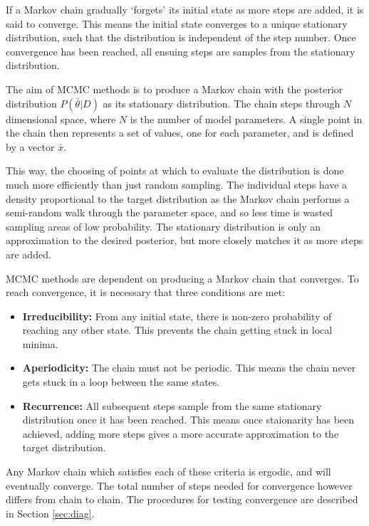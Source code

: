If a Markov chain gradually `forgets' its initial state as more steps are added, it is said to converge. This means the initial state converges to a unique stationary distribution, such that the distribution is independent of the step number. Once convergence has been reached, all ensuing steps are samples from the stationary distribution.

The aim of MCMC methods is to produce a Markov chain with the posterior distribution $P(\bar{\theta}|D)$ as its stationary distribution. The chain steps through $N$ dimensional space, where $N$ is the number of model parameters. A single point in the chain then represents a set of values, one for each parameter, and is defined by a vector $\bar{x}$.

This way, the choosing of points at which to evaluate the distribution is done much more efficiently than just random sampling. The individual steps have a density proportional to the target distribution as the Markov chain performs a semi-random walk through the parameter space, and so less time is wasted sampling areas of low probability.  The stationary distribution is only an approximation to the desired posterior, but more closely matches it as more steps are added. 

MCMC methods are dependent on producing a Markov chain that converges. To reach convergence, it is necessary that three conditions are met:

\begin{itemize}
   \item \textbf{Irreducibility:} From any initial state, there is non-zero probability of reaching any other state. This prevents the chain getting stuck in local minima.
   \item \textbf{Aperiodicity:} The chain must not be periodic. This means the chain never gets stuck in a loop between the same states.
   \item \textbf{Recurrence:} All subsequent steps sample from the same stationary distribution once it has been reached. This means once staionarity has been achieved, adding more steps gives a more accurate approximation to the target distribution.
\end{itemize}

Any Markov chain which satisfies each of these criteria is ergodic, and will eventually converge. The total number of steps needed for convergence however differs from chain to chain. The procedures for testing convergence are described in Section \ref{sec:diag}. 

